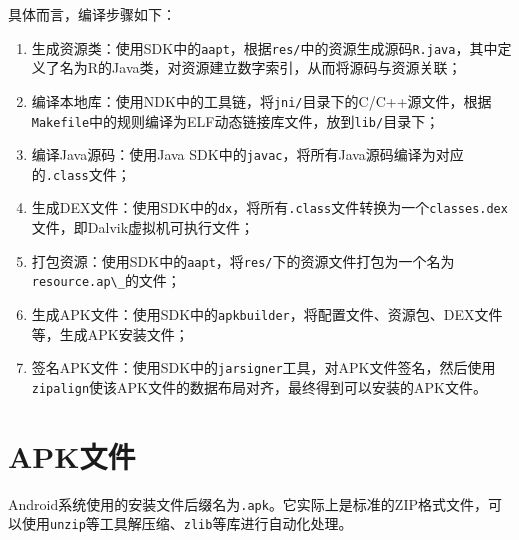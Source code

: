 具体而言，编译步骤如下：
\begin{enumerate}
  \item 生成资源类：使用SDK中的\lstinline!aapt!，根据\lstinline!res/!中的资源生成源码\lstinline!R.java!，其中定义了名为R的Java类，对资源建立数字索引，从而将源码与资源关联；
  \item 编译本地库：使用NDK中的工具链，将\lstinline!jni/!目录下的C/C++源文件，根据\lstinline!Makefile!中的规则编译为ELF动态链接库文件，放到\lstinline!lib/!目录下；
  \item 编译Java源码：使用Java SDK中的\lstinline!javac!，将所有Java源码编译为对应的\lstinline!.class!文件；
  \item 生成DEX文件：使用SDK中的\lstinline!dx!，将所有\lstinline!.class!文件转换为一个\lstinline!classes.dex!文件，即Dalvik虚拟机可执行文件；
  \item 打包资源：使用SDK中的\lstinline!aapt!，将\lstinline!res/!下的资源文件打包为一个名为\lstinline!resource.ap\_!的文件；
  \item 生成APK文件：使用SDK中的\lstinline!apkbuilder!，将配置文件、资源包、DEX文件等，生成APK安装文件；
  \item 签名APK文件：使用SDK中的\lstinline!jarsigner!工具，对APK文件签名，然后使用\lstinline!zipalign!使该APK文件的数据布局对齐，最终得到可以安装的APK文件。
\end{enumerate}

\section{APK文件}
Android系统使用的安装文件后缀名为\lstinline!.apk!。它实际上是标准的ZIP格式\cite{url:zip_format}文件，可以使用\lstinline!unzip!等工具解压缩、\lstinline!zlib!等库进行自动化处理。

